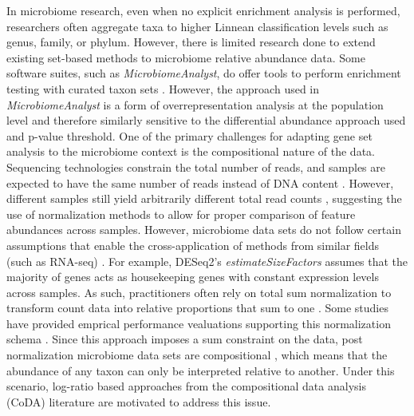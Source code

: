 \documentclass[10pt,letterpaper]{article}
\begin{document}


In microbiome research, even when no explicit enrichment analysis is performed, researchers often aggregate taxa to higher Linnean classification levels such as genus, family, or phylum. However, there is limited research done to extend existing set-based methods to microbiome relative abundance data. Some software suites, such as \emph{MicrobiomeAnalyst}, do offer tools to perform enrichment testing with curated taxon sets \cite{chong2020}. However, the approach used in \emph{MicrobiomeAnalyst} is a form of overrepresentation analysis at the population level and therefore similarly sensitive to the differential abundance approach used and p-value threshold. One of the primary challenges for adapting gene set analysis to the microbiome context is the compositional nature of the data. Sequencing technologies constrain the total number of reads, and samples are expected to have the same number of reads instead of DNA content \cite{quinn2019, quinn2018}. However, different samples still yield arbitrarily different total read counts \cite{morton2019, gloor2017}, suggesting the use of normalization methods to allow for proper comparison of feature abundances across samples. However, microbiome data sets do not follow certain assumptions that enable the cross-application of methods from similar fields (such as RNA-seq) \cite{quinn2019, quinn2018}. For example, DESeq2's \emph{estimateSizeFactors} \cite{love2014} assumes that the majority of genes acts as housekeeping genes with constant expression levels across samples. As such, practitioners often rely on total sum normalization to transform count data into relative proportions that sum to one \cite{weiss2017}. Some studies have provided emprical performance vealuations supporting this normalization schema \cite{mcknight2019}. Since this approach imposes a sum constraint on the data, post normalization microbiome data sets are compositional \cite{gloor2017}, which means that the abundance of any taxon can only be interpreted relative to another. Under this scenario, log-ratio based approaches from the compositional data analysis (CoDA) literature \cite{aitchison1994} are motivated to address this issue. 
\end{document}
